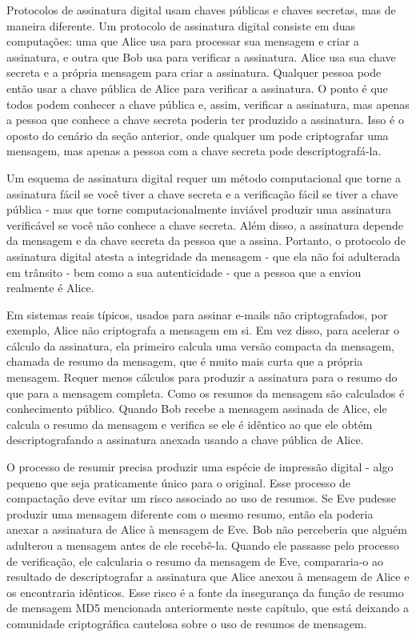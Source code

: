 \documentclass{book}
\begin{document}
Protocolos de assinatura digital usam chaves públicas e chaves secretas, mas de maneira diferente. Um protocolo de assinatura digital consiste em duas computações: uma que Alice usa para processar sua mensagem e criar a assinatura, e outra que Bob usa para verificar a assinatura. Alice usa sua chave secreta e a própria mensagem para criar a assinatura. Qualquer pessoa pode então usar a chave pública de Alice para verificar a assinatura. O ponto é que todos podem conhecer a chave pública e, assim, verificar a assinatura, mas apenas a pessoa que conhece a chave secreta poderia ter produzido a assinatura. Isso é o oposto do cenário da seção anterior, onde qualquer um pode criptografar uma mensagem, mas apenas a pessoa com a chave secreta pode descriptografá-la.

Um esquema de assinatura digital requer um método computacional que torne a assinatura fácil se você tiver a chave secreta e a verificação fácil se tiver a chave pública - mas que torne computacionalmente inviável produzir uma assinatura verificável se você não conhece a chave secreta. Além disso, a assinatura depende da mensagem e da chave secreta da pessoa que a assina. Portanto, o protocolo de assinatura digital atesta a integridade da mensagem - que ela não foi adulterada em trânsito - bem como a sua autenticidade - que a pessoa que a enviou realmente é Alice.

Em sistemas reais típicos, usados para assinar e-mails não criptografados, por exemplo, Alice não criptografa a mensagem em si. Em vez disso, para acelerar o cálculo da assinatura, ela primeiro calcula uma versão compacta da mensagem, chamada de resumo da mensagem, que é muito mais curta que a própria mensagem. Requer menos cálculos para produzir a assinatura para o resumo do que para a mensagem completa. Como os resumos da mensagem são calculados é conhecimento público. Quando Bob recebe a mensagem assinada de Alice, ele calcula o resumo da mensagem e verifica se ele é idêntico ao que ele obtém descriptografando a assinatura anexada usando a chave pública de Alice.

O processo de resumir precisa produzir uma espécie de impressão digital - algo pequeno que seja praticamente único para o original. Esse processo de compactação deve evitar um risco associado ao uso de resumos. Se Eve pudesse produzir uma mensagem diferente com o mesmo resumo, então ela poderia anexar a assinatura de Alice à mensagem de Eve. Bob não perceberia que alguém adulterou a mensagem antes de ele recebê-la. Quando ele passasse pelo processo de verificação, ele calcularia o resumo da mensagem de Eve, compararia-o ao resultado de descriptografar a assinatura que Alice anexou à mensagem de Alice e os encontraria idênticos. Esse risco é a fonte da insegurança da função de resumo de mensagem MD5 mencionada anteriormente neste capítulo, que está deixando a comunidade criptográfica cautelosa sobre o uso de resumos de mensagem.
\end{document}
